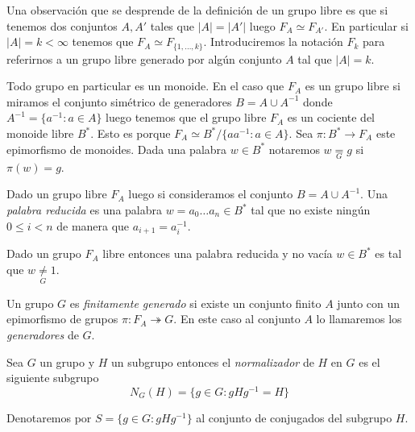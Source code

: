 \documentclass[tesis.tex]{subfiles}
\begin{document}
\begin{obs}
	Una observación que se desprende de la definición de un grupo libre es que si tenemos dos conjuntos $A, A'$ tales que $|A| = |A'|$ luego $F_{A} \simeq F_{A'}$.
En particular si $|A|=k < \infty$ tenemos que $F_{A} \simeq F_{ \{1, \dots, k \} }$.
Introduciremos la notación $F_{k}$ para referirnos a un grupo libre generado por algún conjunto $A$ tal que $|A| = k$.
\end{obs}

Todo grupo en particular es un monoide.
En el caso que $F_{A}$ es un grupo libre si miramos el conjunto simétrico de generadores $B = A \cup A^{-1}$ donde $A^{-1} = \{ a^{-1} : a \in A \}$ luego tenemos que el grupo libre $F_{A}$ es un cociente del monoide libre $B^*$.
Esto es porque $F_{A} \simeq B^{*} / \{ aa^{-1} : a \in A \}$.
Sea $\pi: B^{*} \to F_{A}$ este epimorfismo de monoides.
Dada una palabra $w \in B^{*}$ notaremos $w \underset{G}{=} g$ si $\pi(w) = g$.
	

	

\begin{deff}
	Dado un grupo libre $F_{A}$ luego si consideramos el conjunto $B = A \cup A^{-1}$. 
	Una \emph{palabra reducida} es una palabra $w = a_{0} \dots a_{n} \in B^{*}$ tal que no existe ningún $0 \le i < n$ de manera que $a_{i+1}=a_{i}^{-1}$.
\end{deff}


\begin{obs}\label{obs_libres_pal_red}
	Dado un grupo $F_{A}$ libre entonces una palabra reducida y no vacía $w \in B^*$  es tal que $w \underset{G}{\neq} 1$.
\end{obs}


\begin{deff}
	Un grupo $G$ es \emph{finitamente generado} si existe un conjunto finito $A$ junto con un epimorfismo de grupos $\pi: F_{A} \twoheadrightarrow G$.
	En este caso al conjunto $A$ lo llamaremos los \emph{generadores} de $G$.
\end{deff}


\begin{deff}
	Sea $G$ un grupo y $H$ un subgrupo entonces el \emph{normalizador} de $H$ en $G$ es el siguiente subgrupo
	\begin{equation*}
		N_G(H) = \{ g\in G : gHg^{-1} = H  \}
	\end{equation*}
\end{deff}

Denotaremos por $S= \{ g \in G :  gHg^{-1} \}$ al conjunto de conjugados del subgrupo $H$. 
\end{document}
